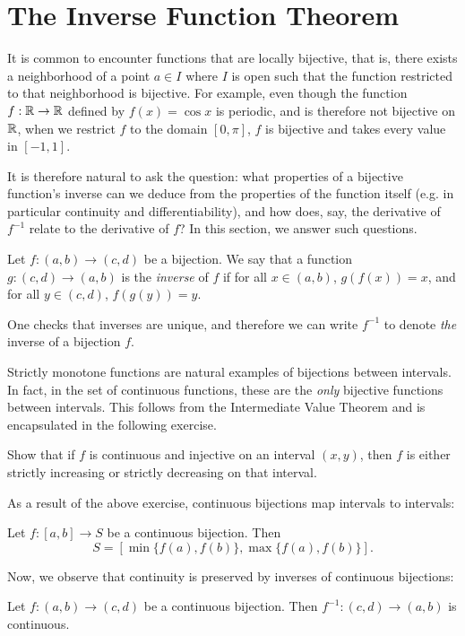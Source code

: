 \documentclass[../analysis1.tex]{subfiles}
\begin{document}
\section{The Inverse Function Theorem}

It is common to encounter functions that are locally bijective, that is, there exists a neighborhood of a point $a\in I$ where $I$ is open such that the function restricted to that neighborhood is bijective. For example, even though the function $f:\mathbb{R}\to\mathbb{R}$ defined by $f(x)=\cos x$ is periodic, and is therefore not bijective on $\mathbb{R}$, when we restrict $f$ to the domain $[0,\pi]$, $f$ is bijective and takes every value in $[-1,1]$.

It is therefore natural to ask the question: what properties of a bijective function's inverse can we deduce from the properties of the function itself (e.g. in particular continuity and differentiability), and how does, say, the derivative of $f^{-1}$ relate to the derivative of $f$? In this section, we answer such questions.

\begin{definition}
    \begin{shaded*}
        Let $f:(a,b)\to (c,d)$ be a bijection. We say that a function $g:(c,d)\to (a,b)$ is the \textit{inverse} of $f$ if for all $x\in (a,b)$, $g(f(x))=x$, and for all $y\in(c,d)$, $f(g(y))=y$.
    \end{shaded*}
\end{definition}

One checks that inverses are unique, and therefore we can write $f^{-1}$ to denote \textit{the} inverse of a bijection $f$.

Strictly monotone functions are natural examples of bijections between intervals. In fact, in the set of continuous functions, these are the \textit{only} bijective functions between intervals.
This follows from the Intermediate Value Theorem and is encapsulated in the following exercise.

\begin{exercise*}
    Show that if $f$ is continuous and injective on an interval $(x,y)$, then $f$ is either strictly increasing or strictly decreasing on that interval.
\end{exercise*}

As a result of the above exercise, continuous bijections map intervals to intervals:
\begin{corollary}
\label{cor:preserveintervals}
    \begin{shaded*}
        Let $f:[a,b]\to S$ be a continuous bijection. Then
        \[S=[\min\{f(a),f(b)\},\max\{f(a),f(b)\}].\]
    \end{shaded*}
\end{corollary}
Now, we observe that continuity is preserved by inverses of continuous bijections:
\begin{theorem}
\label{thm:continuousinverses}
    \begin{shaded*}
        Let $f:(a,b)\to (c,d)$ be a continuous bijection. Then $f^{-1}:(c,d)\to (a,b)$ is continuous.
    \end{shaded*}
\end{theorem}
\end{document}
